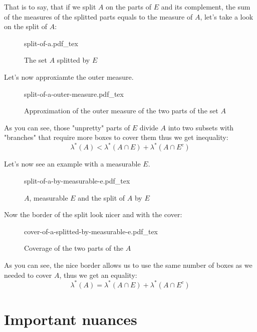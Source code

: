 \documentclass[a4paper]{article}
\newcommand{\incfig}[1]{%
    \def\svgwidth{\columnwidth}
    {#1.pdf_tex}
}
\begin{document}
That is to say, that if we split $A$ on the parts of  $E$ and its complement, the sum of the measures of the splitted parts equals to the measure of $A$, let's take a look on the split of $A$:
\begin{figure}[H]
    \centering
    \incfig{split-of-a}
    \caption{The set $A$ splitted by $E$}
    \label{fig:split-of-a}
\end{figure}

Let's now approxiamte the outer measure.

\begin{figure}[H]
    \centering
    \incfig{split-of-a-outer-measure}
    \caption{Approximation of the outer measure of the two parts of the set $A$}
    \label{fig:split-of-a-outer-measure}
\end{figure}
As you can see, those "unpretty" parts of $E$ divide  $A$ into two subsets with
"branches" that require more boxes to cover them thus we get inequality:
 \[
\lambda^*(A) < \lambda^*(A \cap E) + \lambda^*(A \cap E^c)
\] 

Let's now see an example with a measurable  $E$.

\begin{figure}[H]
    \centering
    \incfig{split-of-a-by-measurable-e}
    \caption{$A$, measurable $E$ and the split of $A$ by $E$}
    \label{fig:split-of-a-by-measurable-e}
\end{figure}

Now the border of the split look nicer and with the cover:
\begin{figure}[H]
    \centering
    \incfig{cover-of-a-splitted-by-measurable-e}
    \caption{Coverage of the two parts of the $A$}
    \label{fig:cover-of-a-splitted-by-measurable-e}
\end{figure}

As you can see, the nice border allows us to use the same number of boxes as we needed to cover $A$, thus we get an equality:
 \[
\lambda^*(A) = \lambda^*(A \cap E) + \lambda^*(A \cap E^c)
\] 

\section{Important nuances}%
\label{sec:Important nuances}
\end{document}
